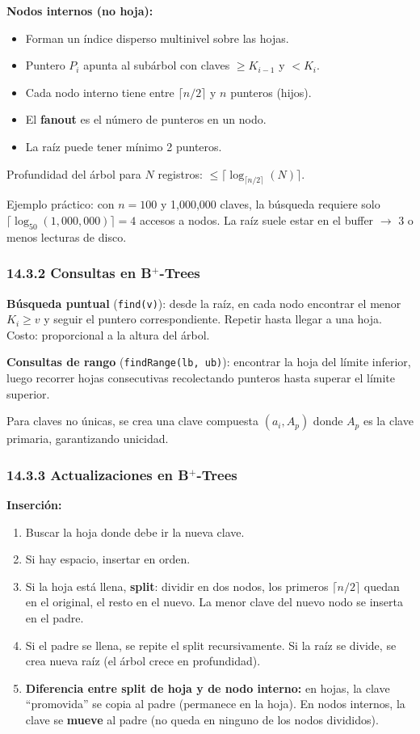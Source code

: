 \documentclass[11pt, a4paper]{article}
\begin{document}
\textbf{Nodos internos (no hoja):}
\begin{itemize}[nosep]
	\item Forman un índice disperso multinivel sobre las hojas.
	\item Puntero $P_i$ apunta al subárbol con claves $\geq K_{i-1}$ y $< K_i$.
	\item Cada nodo interno tiene entre $\lceil n/2 \rceil$ y $n$ punteros (hijos).
	\item El \textbf{fanout} es el número de punteros en un nodo.
	\item La raíz puede tener mínimo 2 punteros.
\end{itemize}

Profundidad del árbol para $N$ registros: $\leq \lceil \log_{\lceil n/2 \rceil}(N) \rceil$.

Ejemplo práctico: con $n = 100$ y 1,000,000 claves, la búsqueda requiere solo $\lceil \log_{50}(1{,}000{,}000) \rceil = 4$ accesos a nodos. La raíz suele estar en el buffer $\rightarrow$ 3 o menos lecturas de disco.

\subsubsection{14.3.2 Consultas en B$^+$-Trees}

\textbf{Búsqueda puntual} (\texttt{find(v)}): desde la raíz, en cada nodo encontrar el menor $K_i \geq v$ y seguir el puntero correspondiente. Repetir hasta llegar a una hoja. Costo: proporcional a la altura del árbol.

\textbf{Consultas de rango} (\texttt{findRange(lb, ub)}): encontrar la hoja del límite inferior, luego recorrer hojas consecutivas recolectando punteros hasta superar el límite superior.

Para claves no únicas, se crea una clave compuesta $(a_i, A_p)$ donde $A_p$ es la clave primaria, garantizando unicidad.

\subsubsection{14.3.3 Actualizaciones en B$^+$-Trees}

\textbf{Inserción:}
\begin{enumerate}[nosep]
	\item Buscar la hoja donde debe ir la nueva clave.
	\item Si hay espacio, insertar en orden.
	\item Si la hoja está llena, \textbf{split}: dividir en dos nodos, los primeros $\lceil n/2 \rceil$ quedan en el original, el resto en el nuevo. La menor clave del nuevo nodo se inserta en el padre.
	\item Si el padre se llena, se repite el split recursivamente. Si la raíz se divide, se crea nueva raíz (el árbol crece en profundidad).
	\item \textbf{Diferencia entre split de hoja y de nodo interno:} en hojas, la clave ``promovida'' se copia al padre (permanece en la hoja). En nodos internos, la clave se \textbf{mueve} al padre (no queda en ninguno de los nodos divididos).
\end{enumerate}
\end{document}

